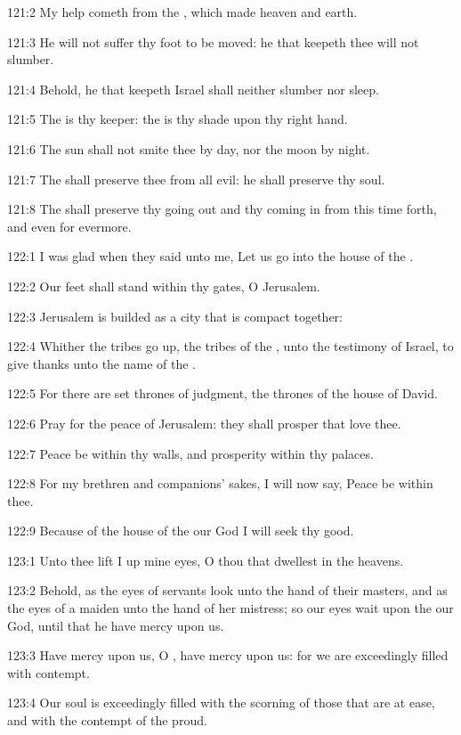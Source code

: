 121:2 My help cometh from the \LORD, which made heaven and earth.

121:3 He will not suffer thy foot to be moved: he that keepeth thee will not slumber.

121:4 Behold, he that keepeth Israel shall neither slumber nor sleep.

121:5 The \LORD is thy keeper: the \LORD is thy shade upon thy right hand.

121:6 The sun shall not smite thee by day, nor the moon by night.

121:7 The \LORD shall preserve thee from all evil: he shall preserve thy soul.

121:8 The \LORD shall preserve thy going out and thy coming in from this time forth, and even for evermore.



122:1 I was glad when they said unto me, Let us go into the house of the \LORD.

122:2 Our feet shall stand within thy gates, O Jerusalem.

122:3 Jerusalem is builded as a city that is compact together:

122:4 Whither the tribes go up, the tribes of the \LORD, unto the testimony of Israel, to give thanks unto the name of the \LORD.

122:5 For there are set thrones of judgment, the thrones of the house of David.

122:6 Pray for the peace of Jerusalem: they shall prosper that love thee.

122:7 Peace be within thy walls, and prosperity within thy palaces.

122:8 For my brethren and companions' sakes, I will now say, Peace be within thee.

122:9 Because of the house of the \LORD our God I will seek thy good.



123:1 Unto thee lift I up mine eyes, O thou that dwellest in the heavens.

123:2 Behold, as the eyes of servants look unto the hand of their masters, and as the eyes of a maiden unto the hand of her mistress; so our eyes wait upon the \LORD our God, until that he have mercy upon us.

123:3 Have mercy upon us, O \LORD, have mercy upon us: for we are exceedingly filled with contempt.

123:4 Our soul is exceedingly filled with the scorning of those that are at ease, and with the contempt of the proud.



